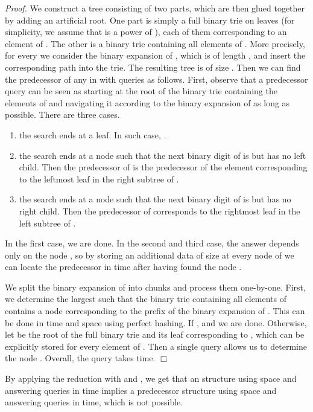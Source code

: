 \documentclass [10pt]{article}
\newcommand{\qed}{\hfill\ensuremath{\Box}\medskip\\\noindent}
\newenvironment{proof}{\noindent\emph{Proof. }}{}
\begin{document}
\begin{proof}
We construct a tree  consisting of two parts, which are then glued together by adding an artificial root. One part is simply a full binary trie
on  leaves (for simplicity, we assume that  is a power of ), each of them corresponding to an element of
. The other is a binary trie containing all elements of .
More precisely, for every  we consider the binary expansion of , which is of length , and insert the corresponding path
into the trie. The resulting tree is of size . Then we can find the predecessor of any  in  with  queries as
follows. First, observe that a predecessor query can be seen as starting at the root of the binary trie containing the elements of  and
navigating it according to the binary expansion of  as long as possible. There are three cases.

\begin{enumerate}
\item the search ends at a leaf. In such case, .
\item the search ends at a node  such that the next binary digit of  is  but  has no left child. Then the predecessor of  is
the predecessor of the element corresponding to the leftmost leaf in the right subtree of .
\item the search ends at a node  such that the next binary digit of  is  but  has no right child. Then the predecessor of  corresponds
to the rightmost leaf in the left subtree of .
\end{enumerate}

In the first case, we are done. In the second and third case, the answer depends only on the node , so by storing an additional data of size 
at every node of  we can locate the predecessor in  time after having found the node .

We split the binary expansion of  into
 chunks  and process them one-by-one. First, we determine the largest  such that the binary
trie containing all elements of  contains a node  corresponding to the prefix  of the binary expansion of .
This can be done in  time and  space using perfect hashing. If ,  and we are done. Otherwise, let
 be the root of the full binary trie and  its leaf corresponding to , which can be explicitly stored for every element of
. Then a single  query allows us to determine the node . Overall, the query takes
 time. \qed
\end{proof}

By applying the reduction with  and , we get that an  structure using  space and answering queries
in  time implies a predecessor structure using  space and answering queries in  time,
which is not possible.
\end{document}
